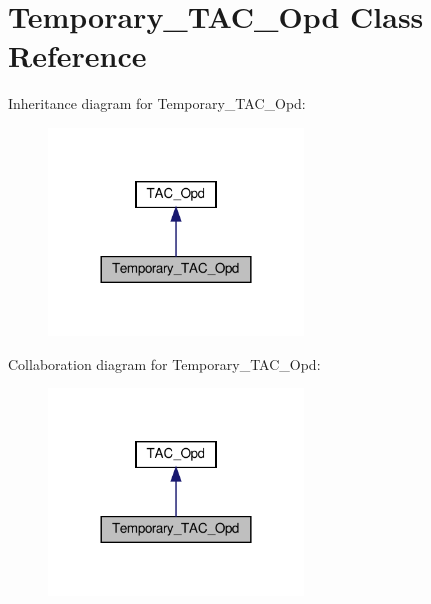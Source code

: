 \hypertarget{classTemporary__TAC__Opd}{}\section{Temporary\+\_\+\+T\+A\+C\+\_\+\+Opd Class Reference}
\label{classTemporary__TAC__Opd}


Inheritance diagram for Temporary\+\_\+\+T\+A\+C\+\_\+\+Opd\+:
\nopagebreak
\begin{figure}[H]
\begin{center}
\leavevmode
\includegraphics[width=192pt]{classTemporary__TAC__Opd__inherit__graph}
\end{center}
\end{figure}


Collaboration diagram for Temporary\+\_\+\+T\+A\+C\+\_\+\+Opd\+:
\nopagebreak
\begin{figure}[H]
\begin{center}
\leavevmode
\includegraphics[width=192pt]{classTemporary__TAC__Opd__coll__graph}
\end{center}
\end{figure}
